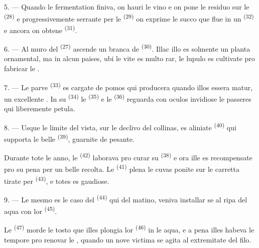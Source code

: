 5. --- Quando le fermentation finiva, on hauri le vino e on pone le residuo sur
le  \textsuperscript{(28)} e progressivemente serrante per le
 \textsuperscript{(29)} on exprime le succo que flue in un
 \textsuperscript{(32)} e ancora on obtene 
\textsuperscript{(31)}.

\VUsaut{6.0mm}
\VUsaut{3.4mm}

6. --- Al muro del  \textsuperscript{(27)} ascende un branca de
 \textsuperscript{(30)}. Illac illo es solmente un planta
ornamental, ma in alcun paises, ubi le vite es multo rar, le lupulo es cultivate
pro fabricar le .

7. --- Le parve  \textsuperscript{(33)} es cargate de pomos qui
producera quando illos essera matur, un excellente . In su
 \textsuperscript{(34)} le  \textsuperscript{(35)}
e le  \textsuperscript{(36)} reguarda con oculos invidiose le
passeres qui liberemente petula.

8. --- Usque le limite del vista, sur le declivo del collinas, es aliniate
 \textsuperscript{(40)} qui supporta le belle
 \textsuperscript{(39)}, guarnite de 
pesante.

Durante tote le anno, le  \textsuperscript{(42)} laborava pro
curar su  \textsuperscript{(38)} e ora ille es recompensate pro su
pena per un belle recolta. Le  \textsuperscript{(41)}
plena le cuvas ponite sur le carretta tirate per 
\textsuperscript{(43)}, e totes es gaudiose.

\VUsaut{5.0mm}
\VUsaut{3.4mm}

9. --- Le mesmo es le caso del  \textsuperscript{(44)}
qui del matino, veniva installar se al ripa del aqua con lor  \textsuperscript{(45)}.

Le  \textsuperscript{(47)} morde le  tosto que illes
plongia lor  \textsuperscript{(46)} in le aqua, e a pena illes
habeva le tempore pro renovar le , quando un nove victima se agita
al extremitate del filo.

